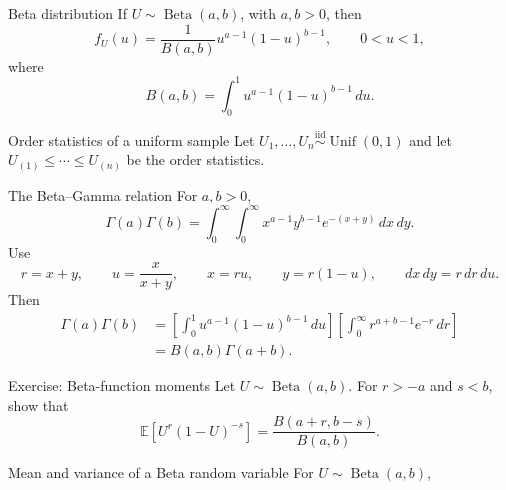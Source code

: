 \documentclass[aspectratio=169,11pt]{beamer}
\newcommand{\E}{\mathbb{E}}
\newcommand{\Var}{\operatorname{Var}}
\begin{document}
\begin{frame}{Beta distribution}
  If $U\sim\operatorname{Beta}(a,b)$, with $a,b>0$, then
  \[
    f_U(u)=\frac{1}{B(a,b)}u^{a-1}(1-u)^{b-1},\qquad 0<u<1,
  \]
  where
  \[
    B(a,b)=\int_0^1u^{a-1}(1-u)^{b-1}\,du.
  \]
\end{frame}

\begin{frame}{Order statistics of a uniform sample}
  Let $U_1,\dots,U_n\stackrel{\mathrm{iid}}\sim\operatorname{Unif}(0,1)$ and let
  $U_{(1)}\le\cdots\le U_{(n)}$ be the order statistics.
\end{frame}

\begin{frame}{The Beta--Gamma relation}
  For $a,b>0$,
  \[
    \Gamma(a)\Gamma(b)
    =\int_0^\infty\!\!\int_0^\infty
      x^{a-1}y^{b-1}e^{-(x+y)}\,dx\,dy.
  \]
  Use
  \[
    r=x+y,\qquad u=\frac{x}{x+y},\qquad
    x=ru,\qquad y=r(1-u),\qquad dx\,dy=r\,dr\,du.
  \]
  Then
  \[
    \begin{aligned}
      \Gamma(a)\Gamma(b)
      &=\left[\int_0^1u^{a-1}(1-u)^{b-1}\,du\right]
        \left[\int_0^\infty r^{a+b-1}e^{-r}\,dr\right]\\
      &=B(a,b)\Gamma(a+b).
  \end{aligned}
\]
\end{frame}

\begin{frame}{Exercise: Beta-function moments}
  Let $U\sim\operatorname{Beta}(a,b)$. For $r>-a$ and $s<b$, show that
  \[
    \mathbb E\!\left[U^r(1-U)^{-s}\right]
    =\frac{B(a+r,b-s)}{B(a,b)}.
  \]
\end{frame}

\begin{frame}{Mean and variance of a Beta random variable}
  For $U\sim\operatorname{Beta}(a,b)$,
  \uncover<1->{
    \[
      \E(U)=\frac{a}{a+b},
      \qquad
      \Var(U)=\frac{ab}{(a+b)^2(a+b+1)}.
    \]
  }
  \uncover<2->{
    \[
      \begin{aligned}
        \E(U)
        &=\frac{B(a+1,b)}{B(a,b)}
          =\frac{a}{a+b},\\[.4em]
        \E(U^2)
        &=\frac{B(a+2,b)}{B(a,b)}
          =\frac{a(a+1)}{(a+b)(a+b+1)},\\[.4em]
        \Var(U)
        &=\E(U^2)-[\E(U)]^2
          =\frac{ab}{(a+b)^2(a+b+1)}.
      \end{aligned}
    \]
  }
\end{frame}
\end{document}
